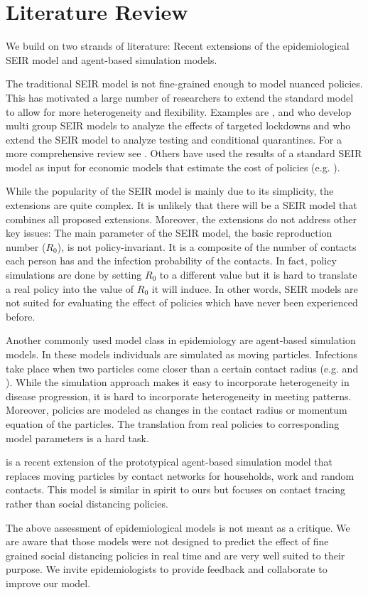 \section{Literature Review}
\label{sec:literature_review}

We build on two strands of literature: Recent extensions of the epidemiological SEIR model and agent-based simulation models.

The traditional SEIR model is not fine-grained enough to model nuanced policies. This has motivated a large number of researchers to extend the standard model to allow for more heterogeneity and flexibility. Examples are \cite{Grimm2020}, \cite{Donsimoni2020} and \cite{Acemoglu2020} who develop multi group SEIR models to analyze the effects of targeted lockdowns and \cite{Berger2020} who extend the SEIR model to analyze testing and conditional quarantines. For a more comprehensive review see \cite{Avery2020}. Others have used the results of a standard SEIR model as input for economic models that estimate the cost of policies (e.g. \cite{Dorn2020}).

While the popularity of the SEIR model is mainly due to its simplicity, the extensions are quite complex. It is unlikely that there will be a SEIR model that combines all proposed extensions. Moreover, the extensions do not address other key issues: The main parameter of the SEIR model, the basic reproduction number ($R_0$), is not policy-invariant. It is a composite of the number of contacts each person has and the infection probability of the contacts. In fact, policy simulations are done by setting $R_0$ to a different value but it is hard to translate a real policy into the value of $R_0$ it will induce. In other words, SEIR models are not suited for evaluating the effect of policies which have never been experienced before.

Another commonly used model class in epidemiology are agent-based simulation models. In these models individuals are simulated as moving particles. Infections take place when two particles come closer than a certain contact radius (e.g. \cite{Silva2020} and \cite{Cuevas2020}). While the simulation approach makes it easy to incorporate heterogeneity in disease progression, it is hard to incorporate heterogeneity in meeting patterns. Moreover, policies are modeled as changes in the contact radius or momentum equation of the particles. The translation from real policies to corresponding model parameters is a hard task.

\cite{Hinch2020} is a recent extension of the prototypical agent-based simulation model that replaces moving particles by contact networks for households, work and random contacts. This model is similar in spirit to ours but focuses on contact tracing rather than social distancing policies.

The above assessment of epidemiological models is not meant as a critique. We are aware that those models were not designed to predict the effect of fine grained social distancing policies in real time and are very well suited to their purpose. We invite epidemiologists to provide feedback and collaborate to improve our model.

